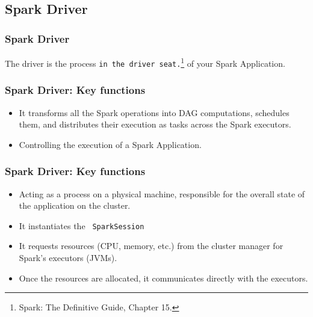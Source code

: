 
\subsection{Spark Driver}\label{subsec:spark-driver}

\begin{frame}
    \frametitle{Spark Driver}
    The driver is the process \texttt{\color{blue}in the driver seat.}\footnote{Spark: The Definitive Guide, Chapter 15.} of your Spark Application.

\end{frame}

\begin{frame}
    \frametitle{Spark Driver: Key functions}


    \begin{itemize}
        \item It transforms all the Spark operations into DAG computations, schedules them, and distributes their execution as tasks across the Spark executors.
        \item Controlling the execution of a Spark Application.

    \end{itemize}

\end{frame}


\begin{frame}
    \frametitle{Spark Driver: Key functions}

    \begin{itemize}
        \item Acting as a process on a physical machine, responsible for the overall state of the application on the cluster.
        \item It instantiates the \texttt{\color{blue} SparkSession}
        \item It requests resources  (CPU, memory, etc.) from the cluster manager for Spark’s executors (JVMs).
        \item Once the resources are allocated, it communicates directly with the executors.
    \end{itemize}

\end{frame}


